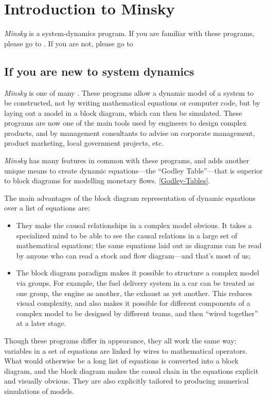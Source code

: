 
\chapter{Introduction to Minsky}

\label{Introduction-Minsky}

\emph{Minsky} is a system-dynamics program. If you are familiar with
these programs, please go to .
If you are not, please go to 

\section{If you are new to system dynamics}

\label{intro:new-system-dynamics}

\emph{Minsky} is one of many .
These programs allow a dynamic model of a system to be constructed,
not by writing mathematical equations or computer code, but by laying
out a model in a block diagram, which can then be simulated. These
programs are now one of the main tools used by engineers to design
complex products, and by management consultants to advise on corporate
management, product marketing, local government projects, etc.

\emph{Minsky} has many features in common with these programs, and
adds another unique means to create dynamic equations---the ``Godley
Table''---that is superior to block diagrams for modelling monetary
flows. \ref{Godley-Tables}.

The main advantages of the block diagram representation of dynamic
equations over a list of equations are:
\begin{itemize}
\item They make the causal relationships in a complex model obvious. It
takes a specialized mind to be able to see the causal relations in
a large set of mathematical equations; the same equations laid out
as diagrams can be read by anyone who can read a stock and flow diagram---and
that's most of us; 
\item The block diagram paradigm makes it possible to structure a complex
model via groups. For example, the fuel delivery system in a car can
be treated as one group, the engine as another, the exhaust as yet
another. This reduces visual complexity, and also makes it possible
for different components of a complex model to be designed by different
teams, and then ``wired together'' at a later stage.
\end{itemize}
Though these programs differ in appearance, they all work the same
way: variables in a set of equations are linked by wires to mathematical
operators. What would otherwise be a long list of equations is converted
into a block diagram, and the block diagram makes the causal chain
in the equations explicit and visually obvious. They are also explicitly
tailored to producing numerical simulations of models.

